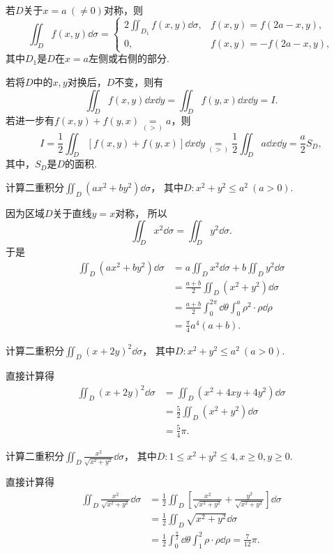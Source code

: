 若\(D\)关于\(x=a\ (\neq0)\)对称，则\[
	\iint_D f(x,y) \dd\sigma
	= \left\{ \begin{array}{cc}
		2 \iint_{D_1} f(x,y) \dd\sigma, & f(x,y) = f(2a-x,y), \\
		0, & f(x,y) = -f(2a-x,y),
	\end{array} \right.
\]
其中\(D_1\)是\(D\)在\(x=a\)左侧或右侧的部分.

\def\op{\underset{(>)}{=}}
若将\(D\)中的\(x,y\)对换后，\(D\)不变，则有\[
	\iint_D f(x,y) \dd{x}\dd{y} = \iint_D f(y,x) \dd{x}\dd{y} = I.
\]
若进一步有\(f(x,y)+f(y,x) \op a\)，则\[
	I = \frac{1}{2} \iint_D [ f(x,y) + f(y,x) ] \dd{x}\dd{y}
	\op \frac{1}{2} \iint_D a \dd{x}\dd{y}
	= \frac{a}{2} S_D,
\]
其中，\(S_D\)是\(D\)的面积.
\endgroup

\begin{example}
计算二重积分\(\iint_D (a x^2 + b y^2) \dd\sigma\)，
其中\(D: x^2 + y^2 \leq a^2\ (a>0)\).
\begin{solution}
因为区域\(D\)关于直线\(y=x\)对称，
所以\begin{equation*}
	\iint_D x^2 \dd\sigma = \iint_D y^2 \dd\sigma.
\end{equation*}
于是\begin{align*}
	\iint_D (a x^2 + b y^2) \dd\sigma
	&= a \iint_D x^2 \dd\sigma + b \iint_D y^2 \dd\sigma \\
	&= \frac{a+b}2 \iint_D (x^2 + y^2) \dd\sigma \\
	&= \frac{a+b}2 \int_0^{2\pi} \dd\theta \int_0^a \rho^2 \cdot \rho \dd\rho \\
	&= \frac\pi4 a^4 (a+b).
\end{align*}
\end{solution}
\end{example}
\begin{example}
计算二重积分\(\iint_D (x+2y)^2 \dd\sigma\)，
其中\(D: x^2 + y^2 \leq a^2\ (a>0)\).
\begin{solution}
直接计算得\begin{align*}
	\iint_D (x+2y)^2 \dd\sigma
	&= \iint_D (x^2+4xy+4y^2) \dd\sigma \\ %
	&= \frac52 \iint_D (x^2+y^2) \dd\sigma \\
	&= \frac54 \pi.
\end{align*}
\end{solution}
\end{example}
\begin{example}
计算二重积分\(\iint_D \frac{x^2}{\sqrt{x^2+y^2}} \dd\sigma\)，
其中\(D: 1 \leq x^2+y^2 \leq 4, x\geq0, y\geq0\).
\begin{solution}
直接计算得\begin{align*}
	\iint_D \frac{x^2}{\sqrt{x^2+y^2}} \dd\sigma
	&= \frac12 \iint_D \left[ \frac{x^2}{\sqrt{x^2+y^2}} + \frac{y^2}{\sqrt{x^2+y^2}} \right] \dd\sigma \\
	&= \frac12 \iint_D \sqrt{x^2+y^2} \dd\sigma \\
	&= \frac12 \int_0^{\frac\pi2} \dd\theta \int_1^2 \rho \cdot \rho \dd\rho
	= \frac{7}{12} \pi.
\end{align*}
\end{solution}
\end{example}
